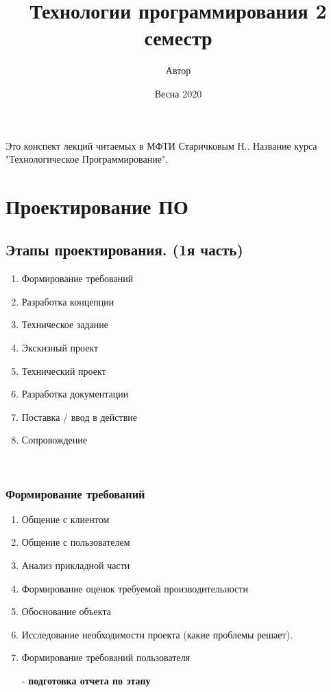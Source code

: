 \documentclass[12pt; a4paper]{book}
\theoremstyle{plain} %
\theoremstyle{defenition}
\theoremstyle{remark}
\begin{document}
 
\let\ms\mathscr  %
\let\ol\overline  %
\let\bs\boldsymbol
\let\ra\rightarrow
\let\b\begin
\let\e\end
\let\it\item
\let\subs\subsection
\let\ns\normalsize
\let\tb\textbf
\large

\frontmatter
\title{Технологии программирования 2 семестр}
\author{Автор} 
\date{Весна 2020}
\maketitle
Это конспект лекций читаемых в МФТИ Старичковым Н.. Название курса "Технологическое Программирование", 


\tableofcontents

\mainmatter
\chapter{Проектирование ПО}

\section{Этапы проектирования. (1я часть)}
\begin{enumerate}
\item Формирование требований
\item Разработка концепции
\item Техническое задание
\item Экскизный проект
\item Технический проект
\item Разработка документации
\item Поставка / ввод в действие
\item Сопровождение
\end{enumerate}\

\subsection{Формирование требований}
\begin{enumerate}
\item Общение с клиентом
\item Общение с пользователем
\item Анализ прикладной части
\item Формирование оценок требуемой производительности
\item Обоснование объекта
\item Исследование необходимости проекта (какие проблемы решает).
\item Формирование требований пользователя
\item[-] \textbf{подготовка отчета по этапу}
\end{enumerate}
\end{document}
